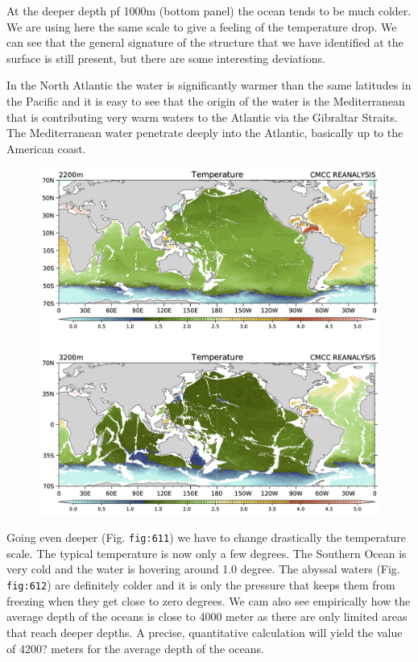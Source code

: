 At the deeper depth pf 1000m (bottom panel) the ocean tends to be much
colder. We are using here the same scale to give a feeling of the
temperature drop. We can see that the general signature of the structure
that we have identified at the surface is still present, but there are
some interesting deviations.

In the North Atlantic the water is significantly warmer than the same
latitudes in the Pacific and it is easy to see that the origin of the
water is the Mediterranean that is contributing very warm waters to the
Atlantic via the Gibraltar Straits. The Mediterranean water penetrate
deeply into the Atlantic, basically up to the American coast.

\begin{figure}
\centering
\includegraphics[width = .7 \textwidth]{figs/GD/Temp2200-3200.png}
\caption{} \label{fig:}
\end{figure}

Going even deeper (Fig. \texttt{fig:611}) we have to change drastically
the temperature scale. The typical temperature is now only a few
degrees. The Southern Ocean is very cold and the water is hovering
around 1.0 degree. The abyssal waters (Fig. \texttt{fig:612}) are
definitely colder and it is only the pressure that keeps them from
freezing when they get close to zero degrees. We cam also see
empirically how the average depth of the oceans is close to 4000 meter
as there are only limited areas that reach deeper depths. A precise,
quantitative calculation will yield the value of 4200? meters for the
average depth of the oceans.

